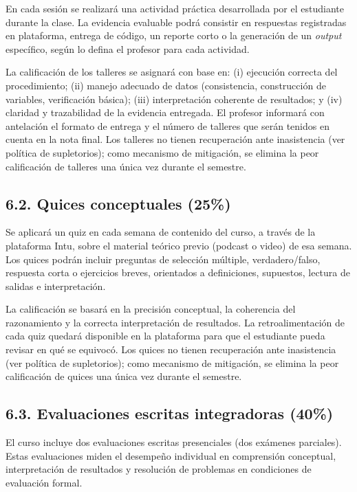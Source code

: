 \documentclass[11pt,a4paper]{article}
\begin{document}
En cada sesión se realizará una actividad práctica desarrollada por el estudiante durante la clase. La evidencia evaluable podrá consistir en respuestas registradas en plataforma, entrega de código, un reporte corto o la generación de un \textit{output} específico, según lo defina el profesor para cada actividad.

\vspace{0.3cm}

La calificación de los talleres se asignará con base en: (i) ejecución correcta del procedimiento; (ii) manejo adecuado de datos (consistencia, construcción de variables, verificación básica); (iii) interpretación coherente de resultados; y (iv) claridad y trazabilidad de la evidencia entregada. El profesor informará con antelación el formato de entrega y el número de talleres que serán tenidos en cuenta en la nota final. Los talleres no tienen recuperación ante inasistencia (ver política de supletorios); como mecanismo de mitigación, se elimina la peor calificación de talleres una única vez durante el semestre.

\subsection*{6.2. Quices conceptuales (25\%)}

Se aplicará un quiz en cada semana de contenido del curso, a través de la plataforma Intu, sobre el material teórico previo (podcast o video) de esa semana. Los quices podrán incluir preguntas de selección múltiple, verdadero/falso, respuesta corta o ejercicios breves, orientados a definiciones, supuestos, lectura de salidas e interpretación.

\vspace{0.3cm}

La calificación se basará en la precisión conceptual, la coherencia del razonamiento y la correcta interpretación de resultados. La retroalimentación de cada quiz quedará disponible en la plataforma para que el estudiante pueda revisar en qué se equivocó. Los quices no tienen recuperación ante inasistencia (ver política de supletorios); como mecanismo de mitigación, se elimina la peor calificación de quices una única vez durante el semestre.

\subsection*{6.3. Evaluaciones escritas integradoras (40\%)}

El curso incluye dos evaluaciones escritas presenciales (dos exámenes parciales). Estas evaluaciones miden el desempeño individual en comprensión conceptual, interpretación de resultados y resolución de problemas en condiciones de evaluación formal.
\end{document}
